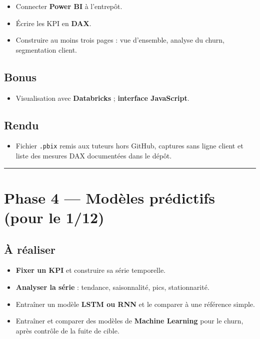 \documentclass[11pt,a4paper]{article}
\providecommand{\tightlist}{\setlength{\itemsep}{0pt}\setlength{\parskip}{0pt}}
\begin{document}
\begin{itemize}
\tightlist
\item
  Connecter \textbf{Power BI} à l'entrepôt.
\item
  Écrire les KPI en \textbf{DAX}.
\item
  Construire au moins trois pages : vue d'ensemble, analyse du churn,
  segmentation client.
\end{itemize}

\subsection{Bonus}\label{bonus-2}

\begin{itemize}
\tightlist
\item
  Visualisation avec \textbf{Databricks} ; \textbf{interface
  JavaScript}.
\end{itemize}

\subsection{Rendu}\label{rendu-2}

\begin{itemize}
\tightlist
\item
  Fichier \texttt{.pbix} remis aux tuteurs hors GitHub, captures sans
  ligne client et liste des mesures DAX documentées dans le dépôt.
\end{itemize}

\begin{center}\rule{0.5\linewidth}{0.5pt}\end{center}

\section{Phase 4 --- Modèles prédictifs (pour le
1/12)}\label{phase-4-moduxe8les-pruxe9dictifs-pour-le-112}

\subsection{À réaliser}\label{uxe0-ruxe9aliser-3}

\begin{itemize}
\tightlist
\item
  \textbf{Fixer un KPI} et construire sa série temporelle.
\item
  \textbf{Analyser la série} : tendance, saisonnalité, pics,
  stationnarité.
\item
  Entraîner un modèle \textbf{LSTM ou RNN} et le comparer à une
  référence simple.
\item
  Entraîner et comparer des modèles de \textbf{Machine Learning} pour le
  churn, après contrôle de la fuite de cible.
\end{itemize}
\end{document}

